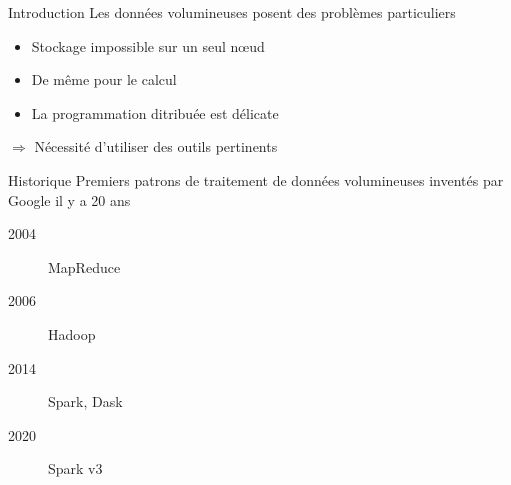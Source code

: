 \begin{frame}{Introduction}
  Les données volumineuses posent des problèmes particuliers

  \begin{itemize}
    \item Stockage impossible sur un seul nœud
    \item De même pour le calcul
    \item La programmation ditribuée est délicate
  \end{itemize}

  $\Rightarrow$ Nécessité d'utiliser des outils pertinents
\end{frame}

\begin{frame}{Historique}
  Premiers patrons de traitement de données volumineuses inventés par Google il y a 20 ans

  \begin{description}
    \item[2004] MapReduce
    \item[2006] Hadoop
    \item[2014] Spark, Dask
    \item[2020] Spark v3
  \end{description}
\end{frame}
